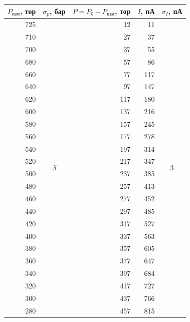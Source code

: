 \documentclass{article}
\begin{document}
\begin{enumerate}
\begin{table}[h!]
\centering
\begin{tabular}{|r|c|r|r|c|}
\hline
\multicolumn{1}{|l|}{$P_\text{изм}$, тор} &
  \multicolumn{1}{l|}{$\sigma_p$, бар} &
  \multicolumn{1}{l|}{$P = P_0 - P_\text{изм}$, тор} &
  \multicolumn{1}{l|}{$I$, пА} &
  \multicolumn{1}{l|}{$\sigma_I$, пА} \\ \hline
725 &
  \multirow{38}{*}{\textit{5}} &
  12 &
  11 &
  \multirow{38}{*}{3} \\ \cline{1-1} \cline{3-4}
710 &  & 27  & 37   &  \\ \cline{1-1} \cline{3-4}
700 &  & 37  & 55   &  \\ \cline{1-1} \cline{3-4}
680 &  & 57  & 86   &  \\ \cline{1-1} \cline{3-4}
660 &  & 77  & 117  &  \\ \cline{1-1} \cline{3-4}
640 &  & 97  & 147  &  \\ \cline{1-1} \cline{3-4}
620 &  & 117 & 180  &  \\ \cline{1-1} \cline{3-4}
600 &  & 137 & 216  &  \\ \cline{1-1} \cline{3-4}
580 &  & 157 & 245  &  \\ \cline{1-1} \cline{3-4}
560 &  & 177 & 278  &  \\ \cline{1-1} \cline{3-4}
540 &  & 197 & 314  &  \\ \cline{1-1} \cline{3-4}
520 &  & 217 & 347  &  \\ \cline{1-1} \cline{3-4}
500 &  & 237 & 385  &  \\ \cline{1-1} \cline{3-4}
480 &  & 257 & 413  &  \\ \cline{1-1} \cline{3-4}
460 &  & 277 & 452  &  \\ \cline{1-1} \cline{3-4}
440 &  & 297 & 485  &  \\ \cline{1-1} \cline{3-4}
420 &  & 317 & 527  &  \\ \cline{1-1} \cline{3-4}
400 &  & 337 & 563  &  \\ \cline{1-1} \cline{3-4}
380 &  & 357 & 605  &  \\ \cline{1-1} \cline{3-4}
360 &  & 377 & 647  &  \\ \cline{1-1} \cline{3-4}
340 &  & 397 & 684  &  \\ \cline{1-1} \cline{3-4}
320 &  & 417 & 727  &  \\ \cline{1-1} \cline{3-4}
300 &  & 437 & 766  &  \\ \cline{1-1} \cline{3-4}
280 &  & 457 & 815  &  \\ \cline{1-1} \cline{3-4}

\end{tabular}
\end{table}
\end{enumerate}
\end{document}
